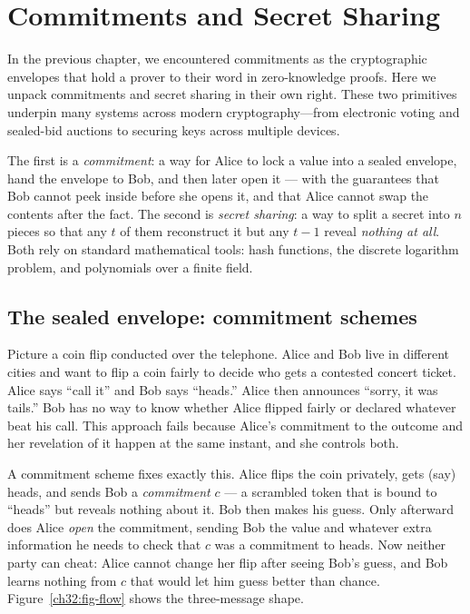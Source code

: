 \chapter{Commitments and Secret Sharing}

In the previous chapter, we encountered commitments as the cryptographic envelopes that hold a prover to their word in zero-knowledge proofs. Here we unpack commitments and secret sharing in their own right. These two primitives underpin many systems across modern cryptography---from electronic voting and sealed-bid auctions to securing keys across multiple devices.

The first is a \emph{commitment}: a way for Alice to lock a value into a sealed envelope, hand the envelope to Bob, and then later open it --- with the guarantees that Bob cannot peek inside before she opens it, and that Alice cannot swap the contents after the fact. The second is \emph{secret sharing}: a way to split a secret into $n$ pieces so that any $t$ of them reconstruct it but any $t-1$ reveal \emph{nothing at all}. Both rely on standard mathematical tools: hash functions, the discrete logarithm problem, and polynomials over a finite field.

\chapterline

\section{The sealed envelope: commitment schemes}
\label{ch32:intro}

Picture a coin flip conducted over the telephone. Alice and Bob live in different cities and want to flip a coin fairly to decide who gets a contested concert ticket. Alice says ``call it'' and Bob says ``heads.'' Alice then announces ``sorry, it was tails.'' Bob has no way to know whether Alice flipped fairly or declared whatever beat his call. This approach fails because Alice's commitment to the outcome and her revelation of it happen at the same instant, and she controls both.

A commitment scheme fixes exactly this. Alice flips the coin privately, gets (say) heads, and sends Bob a \emph{commitment} $c$ --- a scrambled token that is bound to ``heads'' but reveals nothing about it. Bob then makes his guess. Only afterward does Alice \emph{open} the commitment, sending Bob the value and whatever extra information he needs to check that $c$ was a commitment to heads. Now neither party can cheat: Alice cannot change her flip after seeing Bob's guess, and Bob learns nothing from $c$ that would let him guess better than chance. Figure~\ref{ch32:fig-flow} shows the three-message shape.

